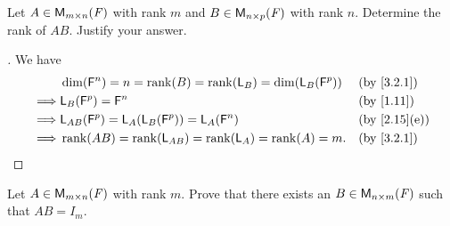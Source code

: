\begin{ex}\label{ex:3.2.19}
	Let \(A \in \ms\) with rank \(m\) and \(B \in \ms[n][p][\F]\) with rank \(n\).
	Determine the rank of \(AB\).
	Justify your answer.
\end{ex}

\begin{proof}[]
	We have
	\begin{align*}
		         & \dim(\vs{F}^n) = n = \rk{B} = \rk{\L_B} = \dim(\L_B(\vs{F}^p)) &  & \by{3.2.1}   \\
		\implies & \L_B(\vs{F}^p) = \vs{F}^n                                      &  & \by{1.11}    \\
		\implies & \L_{AB}(\vs{F}^p) = \L_A(\L_B(\vs{F}^p)) = \L_A(\vs{F}^n)      &  & \by{2.15}[e] \\
		\implies & \rk{AB} = \rk{\L_{AB}} = \rk{\L_A} = \rk{A} = m.               &  & \by{3.2.1}
	\end{align*}
\end{proof}

\setcounter{ex}{20}
\begin{ex}\label{ex:3.2.21}
	Let \(A \in \ms\) with rank \(m\).
	Prove that there exists an \(B \in \ms[n][m][\F]\) such that \(AB = I_m\).
\end{ex}

